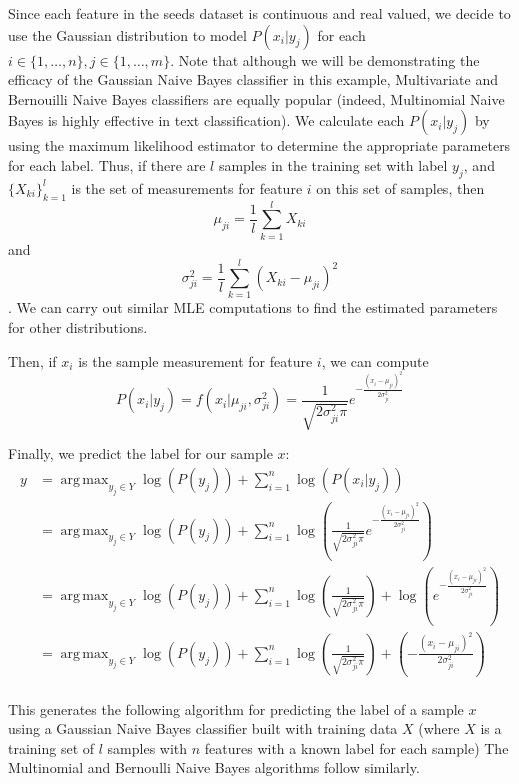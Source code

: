 \documentclass[12pt]{article}
\newcommand{\p}[1]{\left(#1\right)}
\DeclareMathOperator*{\argmax}{\arg\,max}
\begin{document}
Since each feature in the seeds dataset is continuous and real valued, we decide to use the Gaussian distribution to model $P(x_i| y_j)$ for each $i \in \{1, \ldots, n\}, j \in \{1, \ldots, m\}$.
Note that although we will be demonstrating the efficacy of the Gaussian Naive Bayes classifier in this example, Multivariate and Bernouilli Naive Bayes classifiers are equally popular (indeed, Multinomial Naive Bayes is highly effective in text classification).
We calculate each $P(x_i | y_j)$ by using the maximum likelihood estimator to determine the appropriate parameters for each label.
Thus, if there are $l$ samples in the training set with label $y_j$, and $\{X_{ki}\}_{k=1}^l$ is the set of measurements for feature $i$ on this set of samples, then $$\mu_{ji} = \frac{1}{l} \sum_{k=1}^l X_{ki}$$ and $$\sigma^2_{ji} = \frac{1}{l} \sum_{k=1}^l (X_{ki} - \mu_{ji})^2$$.
We can carry out similar MLE computations to find the estimated parameters for other distributions. 

Then, if $x_i$ is the sample measurement for feature $i$, we can compute  $$P(x_i | y_j) = f(x_i | \mu_{ji}, \sigma^2_{ji}) = \frac{1}{\sqrt{2 \sigma_{ji}^2 \pi}} e^{-\frac{(x_i - \mu_{ji})^2}{2 \sigma_{ji}^2}}$$

Finally, we predict the label for our sample $x$: 
\begin{align*}
y &= \argmax_{y_j \in Y}\log(P(y_j)) + \sum_{i=1}^n \log(P(x_i|y_j))\\
&= \argmax_{y_j \in Y}\log(P(y_j)) + \sum_{i=1}^n \log\p{\frac{1}{\sqrt{2 \sigma_{ji}^2 \pi}} e^{-\frac{(x_i - \mu_{ji})^2}{2 \sigma_{ji}^2}}}\\
&= \argmax_{y_j \in Y}\log(P(y_j)) + \sum_{i=1}^n \log\p{\frac{1}{\sqrt{2 \sigma_{ji}^2 \pi}}} + \log \p{ e^{-\frac{(x_i - \mu_{ji})^2}{2 \sigma_{ji}^2}}}\\
&= \argmax_{y_j \in Y}\log(P(y_j)) + \sum_{i=1}^n \log\p{\frac{1}{\sqrt{2 \sigma_{ji}^2 \pi}}} +  \p{-\frac{(x_i - \mu_{ji})^2}{2 \sigma_{ji}^2}}\\
\end{align*}

This generates the following algorithm for predicting the label of a sample $x$ using a Gaussian Naive Bayes classifier built with training data $X$ (where $X$ is a training set of $l$ samples with $n$ features with a known label for each sample)
The Multinomial and Bernoulli Naive Bayes algorithms follow similarly.
\end{document}
